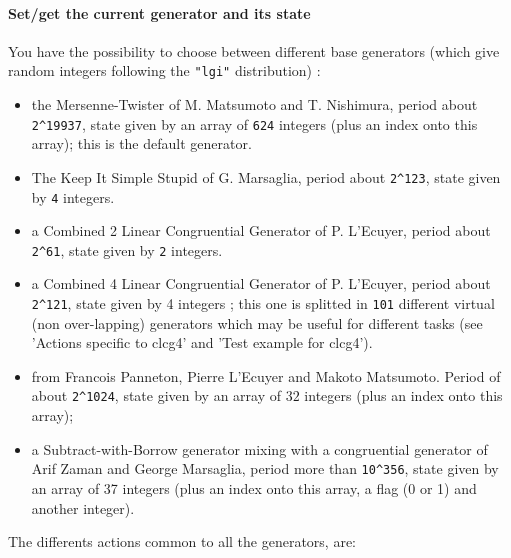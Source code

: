 \paragraph{Set/get the current generator and its state}
You have the possibility to choose between different base 
generators (which give random integers following the \verb!"lgi"!
distribution) :
\begin{itemize}
\item {}  the Mersenne-Twister of M. Matsumoto and T. Nishimura, period about \verb!2^19937!, 
  state given by an array of \verb!624! integers (plus an index onto this array); this  
  is the default generator.
\item {}  The Keep It Simple Stupid of G. Marsaglia,  period about \verb!2^123!,
  state given by \verb!4! integers.
\item {}  a Combined 2 Linear Congruential Generator of P. L'Ecuyer,
  period about \verb!2^61!, state given by \verb!2! integers.
\item {}  a Combined 4 Linear Congruential Generator of P. L'Ecuyer,
  period about \verb!2^121!, state given by 4 integers ; this one is 
  splitted in \verb!101! different virtual (non over-lapping) generators 
  which may be useful for different tasks (see 'Actions specific to clcg4' and
  'Test example for clcg4').
\item {} from Francois Panneton, Pierre L'Ecuyer and
  Makoto Matsumoto. Period of about \verb!2^1024!, state given by an array of $32$
  integers (plus an index onto this array);
\item {} a Subtract-with-Borrow generator mixing with a congruential
  generator of Arif Zaman and George Marsaglia, period more than \verb!10^356!,
  state given by an array of 37 integers (plus an index onto this array, a flag (0 or 1)
  and another integer). 
\end{itemize}
The differents actions common to all the generators, are:
